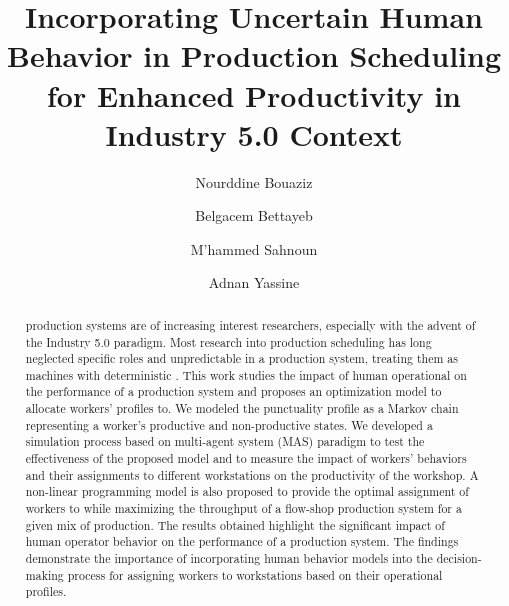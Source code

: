 \documentclass[review,12pt, 3p, times]{elsarticle}
\begin{document}
\begin{frontmatter}
\title{Incorporating Uncertain Human Behavior in Production Scheduling for Enhanced Productivity in Industry 5.0 Context }

\author[inst1]{Nourddine Bouaziz}
\author[inst2]{Belgacem Bettayeb}
\author[inst1]{M'hammed Sahnoun}
\author[inst3]{Adnan Yassine}









\begin{abstract}
 
production systems are of increasing interest  researchers, especially with the advent of the Industry 5.0 paradigm. Most research into production scheduling has long neglected  specific roles and unpredictable  in a production system, treating them as machines with deterministic . This work studies the impact of human operational on the performance of a production system and proposes an optimization model to allocate workers' profiles to. We modeled the punctuality profile as a Markov chain representing a worker's productive and non-productive states. We developed a simulation process based on  multi-agent system (MAS) paradigm to test the effectiveness of the proposed model and to measure the impact of workers' behaviors and their assignments to different workstations on the productivity of the workshop. A non-linear programming model is also proposed to provide the optimal assignment of workers to  while maximizing the throughput of a  flow-shop production system for a given mix of production. The results obtained highlight the significant impact of human operator behavior on the performance of a production system. The findings demonstrate the importance of incorporating human behavior models into the decision-making process for assigning workers to workstations based on their operational profiles.
\end{abstract}



\end{frontmatter}
\end{document}
